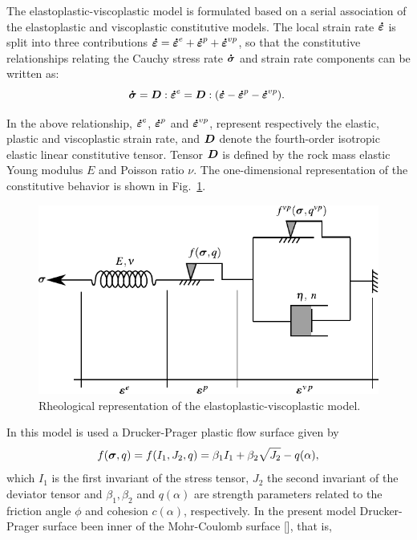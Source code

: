 \documentclass[a4paper,fleqn]{cas-sc}
\begin{document}
The elastoplastic-viscoplastic model is formulated based on a serial association of the elastoplastic and viscoplastic constitutive models. The local strain rate $\boldsymbol{\dot{\varepsilon}}$ is split into three contributions $\boldsymbol{\dot{\varepsilon}} = \boldsymbol{\dot{\varepsilon}}^{e} + \boldsymbol{\dot{\varepsilon}}^{p} + \boldsymbol{\dot{\varepsilon}}^{vp}$, so that the constitutive relationships relating the Cauchy stress rate $\boldsymbol{\dot{\sigma}}$ and strain rate components can be written as:
\begin{equation} \label{eq_constitutive_relationship_epvp}
	\boldsymbol{\dot{\sigma}} = \boldsymbol{D} : \boldsymbol{\dot{\varepsilon}}^{e} = \boldsymbol{D} : (\boldsymbol{\dot{\varepsilon}} - \boldsymbol{\dot{\varepsilon}}^{p} - \boldsymbol{\dot{\varepsilon}}^{vp}).\;
\end{equation}

In the above relationship, $\boldsymbol{\dot{\varepsilon}}^{e}$, $\boldsymbol{\dot{\varepsilon}}^{p}$ and $\boldsymbol{\dot{\varepsilon}}^{vp}$, represent respectively the elastic, plastic and viscoplastic strain rate, and $\boldsymbol{D}$ denote the fourth-order isotropic elastic linear constitutive tensor. Tensor $\boldsymbol{D}$ is defined by the rock mass elastic Young modulus $E$ and Poisson ratio $\nu$. The one-dimensional representation of the constitutive behavior is shown in Fig.~\ref{reological_scheme}.
\begin{figure}[h!]
	\centering
	\includegraphics[scale=1]{Rheological representation.pdf}
	\caption{Rheological representation of the elastoplastic-viscoplastic model.}
	\label{reological_scheme}
\end{figure}
In this model is used a Drucker-Prager plastic flow surface given by
\begin{equation}
	\label{eq:f_Drucker_Prager}
	f(\boldsymbol{\sigma},q) = f(I_1,J_2,q) = \beta_1 I_1 +\beta_2 \sqrt{J_2}-q(\alpha),
\end{equation}
which $I_1$ is the first invariant of the stress tensor, $J_2$ the second invariant of the deviator tensor and $\beta_1, \beta_2$ and $q(\alpha)$ are strength parameters related to the friction angle $\phi$ and cohesion $c(\alpha)$, respectively. In the present model Drucker-Prager surface been inner of the Mohr-Coulomb surface [], that is,
\end{document}

